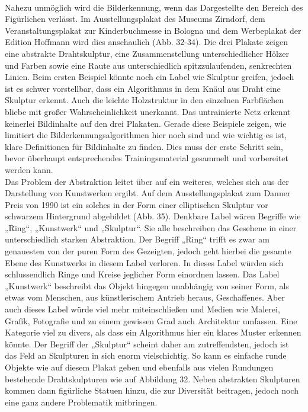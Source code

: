 \documentclass[a4paper,12pt,ngerman]{article}
\begin{document}
\\
Nahezu unmöglich wird die Bilderkennung, wenn das Dargestellte den Bereich des Figürlichen verlässt. Im Ausstellungsplakat des Museums Zirndorf, dem Veranstaltungsplakat zur Kinderbuchmesse in Bologna und dem Werbeplakat der Edition Hoffmann wird dies anschaulich (Abb. 32-34). Die drei Plakate zeigen eine abstrakte Drahtskulptur, eine Zusammenstellung unterschiedlicher Hölzer und Farben sowie eine Raute aus unterschiedlich spitzzulaufenden, senkrechten Linien. Beim ersten Beispiel könnte noch ein Label wie Skulptur greifen, jedoch ist es schwer vorstellbar, dass ein Algorithmus in dem Knäul aus Draht eine Skulptur erkennt. Auch die leichte Holzstruktur in den einzelnen Farbflächen bliebe mit großer Wahrscheinlichkeit unerkannt. Das untrainierte Netz erkennt keinerlei Bildinhalte auf den drei Plakaten. Gerade diese Beispiele zeigen, wie limitiert die Bilderkennungsalgorithmen hier noch sind und wie wichtig es ist, klare Definitionen für Bildinhalte zu finden. Dies muss der erste Schritt sein, bevor überhaupt entsprechendes Trainingsmaterial gesammelt und vorbereitet werden kann. \\
Das Problem der Abstraktion leitet über auf ein weiteres, welches sich aus der Darstellung von Kunstwerken ergibt. Auf dem Ausstellungsplakat zum Danner Preis von 1990 ist ein solches in der Form einer elliptischen Skulptur vor schwarzem Hintergrund abgebildet (Abb. 35). Denkbare Label wären Begriffe wie „Ring“, „Kunstwerk“ und „Skulptur“. Sie alle beschreiben das Gesehene in einer unterschiedlich starken Abstraktion. Der Begriff „Ring“ trifft es zwar am genauesten von der puren Form des Gezeigten, jedoch geht hierbei die gesamte Ebene des Kunstwerks in diesem Label verloren. In dieses Label würden sich schlussendlich Ringe und Kreise jeglicher Form einordnen lassen. Das Label „Kunstwerk“ beschreibt das Objekt hingegen unabhängig von seiner Form, als etwas vom Menschen, aus künstlerischem Antrieb heraus, Geschaffenes. Aber auch dieses Label würde viel mehr miteinschließen und Medien wie Malerei, Grafik, Fotografie und zu einem gewissen Grad auch Architektur umfassen. Eine Kategorie viel zu divers, als dass ein Algorithmus hier ein klares Muster erkennen könnte. Der Begriff der „Skulptur“ scheint daher am zutreffendsten, jedoch ist das Feld an Skulpturen in sich enorm vielschichtig. So kann es einfache runde Objekte wie auf diesem Plakat geben und ebenfalls aus vielen Rundungen bestehende Drahtskulpturen wie auf Abbildung 32. Neben abstrakten Skulpturen kommen dann figürliche Statuen hinzu, die zur Diversität beitragen, jedoch noch eine ganz andere Problematik mitbringen.\\
\end{document}
